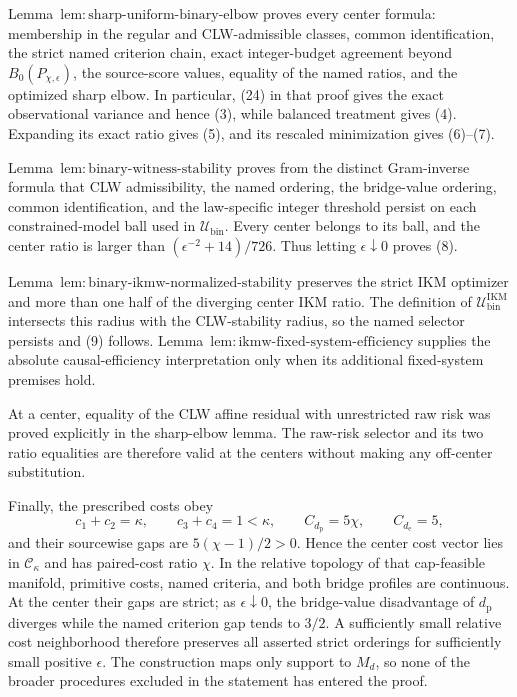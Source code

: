 Lemma~\(\mathrm{lem{:}sharp\text{-}uniform\text{-}binary\text{-}elbow}\) proves every center formula: membership in the regular and CLW-admissible classes, common identification, the strict named criterion chain, exact integer-budget agreement beyond \(B_0(P_{\chi,\epsilon})\), the source-score values, equality of the named ratios, and the optimized sharp elbow. In particular, (24) in that proof gives the exact observational variance and hence (3), while balanced treatment gives (4). Expanding its exact ratio gives (5), and its rescaled minimization gives (6)--(7).

Lemma~\(\mathrm{lem{:}binary\text{-}witness\text{-}stability}\) proves from the distinct Gram-inverse formula that CLW admissibility, the named ordering, the bridge-value ordering, common identification, and the law-specific integer threshold persist on each constrained-model ball used in \(\mathcal U_{\mathrm{bin}}\). Every center belongs to its ball, and the center ratio is larger than \((\epsilon^{-2}+14)/726\). Thus letting \(\epsilon\downarrow0\) proves (8).

Lemma~\(\mathrm{lem{:}binary\text{-}ikmw\text{-}normalized\text{-}stability}\) preserves the strict IKM optimizer and more than one half of the diverging center IKM ratio. The definition of \(\mathcal U_{\mathrm{bin}}^{\mathrm{IKM}}\) intersects this radius with the CLW-stability radius, so the named selector persists and (9) follows. Lemma~\(\mathrm{lem{:}ikmw\text{-}fixed\text{-}system\text{-}efficiency}\) supplies the absolute causal-efficiency interpretation only when its additional fixed-system premises hold.

At a center, equality of the CLW affine residual with unrestricted raw risk was proved explicitly in the sharp-elbow lemma. The raw-risk selector and its two ratio equalities are therefore valid at the centers without making any off-center substitution.

Finally, the prescribed costs obey
\[
 c_1+c_2=\kappa,
 \qquad c_3+c_4=1<\kappa,
 \qquad C_{d_{\mathrm p}}=5\chi,
 \qquad C_{d_{\mathrm e}}=5,
\]
and their sourcewise gaps are \(5(\chi-1)/2>0\). Hence the center cost vector lies in \(\mathcal C_\kappa\) and has paired-cost ratio \(\chi\). In the relative topology of that cap-feasible manifold, primitive costs, named criteria, and both bridge profiles are continuous. At the center their gaps are strict; as \(\epsilon\downarrow0\), the bridge-value disadvantage of \(d_{\mathrm p}\) diverges while the named criterion gap tends to \(3/2\). A sufficiently small relative cost neighborhood therefore preserves all asserted strict orderings for sufficiently small positive \(\epsilon\). The construction maps only support to \(M_d\), so none of the broader procedures excluded in the statement has entered the proof.